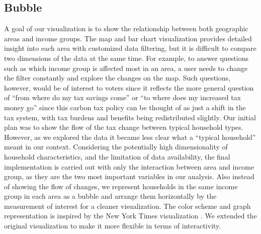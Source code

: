 \documentclass{sigchi}
\begin{document}
\subsection{Bubble}
A goal of our visualization is to show the relationship between both geographic areas and income groups. The map and bar chart visualization provides detailed insight into each area with customized data filtering, but it is difficult to compare two dimensions of the data at the same time. For example, to answer questions such as which income group is affected most in an area, a user needs to change the filter constantly and explore the changes on the map. Such questions, however, would be of interest to voters since it reflects the more general question of ``from where do my tax savings come'' or ``to where does my increased tax money go'' since this carbon tax policy can be thought of as just a shift in the tax system, with tax burdens and benefits being redistributed slightly. Our initial plan was to show the flow of the tax change between typical household types.  However, as we explored the data it became less clear what a ``typical household'' meant in our context. Considering the potentially high dimensionality of household characteristics, and the limitation of data availability, the final implementation is carried out with only the interaction between area and income group, as they are the two most important variables in our analysis.  Also instead of showing the flow of changes, we represent households in the same income group in each area as a bubble and arrange them horizontally by the measurement of interest for a cleaner visualization. The color scheme and graph representation is inspired by the New York Times visualization \cite{nytimes}. We extended the original visualization to make it more flexible in terms of interactivity.
\end{document}
